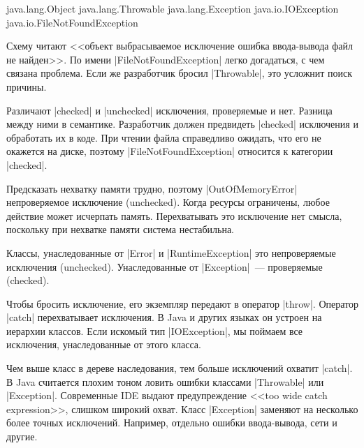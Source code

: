 \begin{english}
  \begin{text}
java.lang.Object
  java.lang.Throwable
    java.lang.Exception
      java.io.IOException
        java.io.FileNotFoundException
  \end{text}
\end{english}

Схему читают <<объект \arr выбрасываемое \arr исключение \arr ошибка
ввода-вывода \arr файл не найден>>. По имени \spverb|FileNotFoundException|
легко догадаться, с чем связана проблема. Если же разработчик бросил
\spverb|Throwable|, это усложнит поиск причины.

Различают \spverb|checked| и \spverb|unchecked| исключения, проверяемые и
нет. Разница между ними в семантике. Разработчик должен предвидеть
\spverb|checked| исключения и обработать их в коде. При чтении файла справедливо
ожидать, что его не окажется на диске, поэтому \spverb|FileNotFoundException|
относится к категории \spverb|checked|.


Предсказать нехватку памяти трудно, поэтому \spverb|OutOfMemoryError|
непроверяемое исключение (unchecked). Когда ресурсы ограничены, любое действие
может исчерпать память. Перехватывать это исключение нет смысла, поскольку при
нехватке памяти система нестабильна.


Классы, унаследованные от \spverb|Error| и \spverb|RuntimeException| это
непроверяемые исключения (unchecked). Унаследованные от \spverb|Exception|~---
проверяемые (checked).



Чтобы бросить исключение, его экземпляр передают в оператор
\spverb|throw|. Оператор \spverb|catch| перехватывает исключения. В Java и
других языках он устроен на иерархии классов. Если искомый тип
\spverb|IOException|, мы поймаем все исключения, унаследованные от этого класса.

Чем выше класс в дереве наследования, тем больше исключений охватит
\spverb|catch|. В Java считается плохим тоном ловить ошибки классами
\spverb|Throwable| или \spverb|Exception|. Современные IDE выдают предупреждение
<<too wide catch expression>>, слишком широкий охват. Класс \spverb|Exception|
заменяют на несколько более точных исключений. Например, отдельно ошибки
ввода-вывода, сети и другие.

